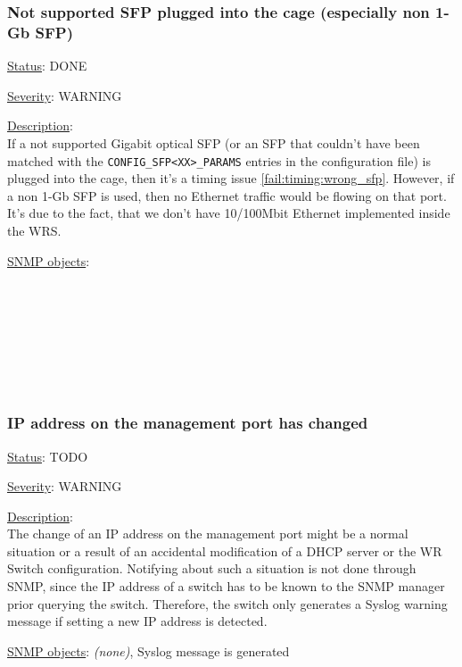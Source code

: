 \subsubsection{\bf Not supported SFP plugged into the cage (especially non 1-Gb SFP)}
		\label{fail:other:sfp}
		\begin{pck_descr}
			\item [] \underline{Status}: DONE
			\item [] \underline{Severity}: WARNING
			\item [] \underline{Description}:\\
				If a not supported Gigabit optical SFP (or an SFP that couldn't have
				been matched with the \texttt{CONFIG\_SFP<XX>\_PARAMS} entries in the
				configuration file) is plugged into the cage, then it's a timing issue
				\ref{fail:timing:wrong_sfp}. However, if a non 1-Gb
				SFP is used, then no Ethernet traffic would be flowing on that port.
				It's due to the fact, that we don't have 10/100Mbit Ethernet implemented
				inside the WRS.
			\item [] \underline{SNMP objects}:\\
				{\footnotesize
				\\
				\\
				\\
				\\
				\\
				\\
				\\
				 }
		\end{pck_descr}

\subsubsection{\bf IP address on the management port has changed}
		\begin{pck_descr}
			\item [] \underline{Status}: TODO
			\item [] \underline{Severity}: WARNING
			\item [] \underline{Description}:\\
				The change of an IP address on the management port might be a normal
				situation or a result of an accidental modification of a DHCP server or
				the WR Switch configuration. Notifying about such a situation is not
				done through SNMP, since the IP address of a switch has to be known to
				the SNMP manager prior querying the switch. Therefore, the switch only
				generates a Syslog warning message if setting a new IP address is
				detected.
			\item [] \underline{SNMP objects}: \emph{(none)}, Syslog message is
				generated
		\end{pck_descr}

